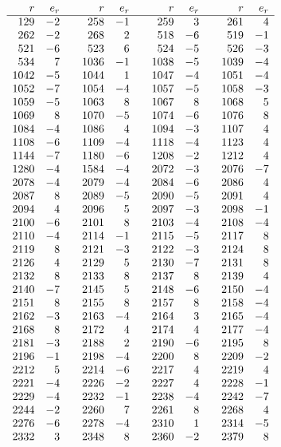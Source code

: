 {\small
\[
\begin{array}{rr@{\qquad}rr@{\qquad}rr@{\qquad}rr}
r&e_r&r&e_r&r&e_r&r&e_r\\ \hline
129&-2&258&-1&259&3&261&4\\
262&-2&268&2&518&-6&519&-1\\
521&-6&523&6&524&-5&526&-3\\
534&7&1036&-1&1038&-5&1039&-4\\
1042&-5&1044&1&1047&-4&1051&-4\\
1052&-7&1054&-4&1057&-5&1058&-3\\
1059&-5&1063&8&1067&8&1068&5\\
1069&8&1070&-5&1074&-6&1076&8\\
1084&-4&1086&4&1094&-3&1107&4\\
1108&-6&1109&-4&1118&-4&1123&4\\
1144&-7&1180&-6&1208&-2&1212&4\\
1280&-4&1584&-4&2072&-3&2076&-7\\
2078&-4&2079&-4&2084&-6&2086&4\\
2087&8&2089&-5&2090&-5&2091&4\\
2094&4&2096&5&2097&-3&2098&-1\\
2100&-6&2101&8&2103&-4&2108&-4\\
2110&-4&2114&-1&2115&-5&2117&8\\
2119&8&2121&-3&2122&-3&2124&8\\
2126&4&2129&5&2130&-7&2131&8\\
2132&8&2133&8&2137&8&2139&4\\
2140&-7&2145&5&2148&-6&2150&-4\\
2151&8&2155&8&2157&8&2158&-4\\
2162&-3&2163&-4&2164&3&2165&-4\\
2168&8&2172&4&2174&4&2177&-4\\
2181&-3&2188&2&2190&-6&2195&8\\
2196&-1&2198&-4&2200&8&2209&-2\\
2212&5&2214&-6&2217&4&2219&4\\
2221&-4&2226&-2&2227&4&2228&-1\\
2229&-4&2232&-1&2238&-4&2242&-7\\
2244&-2&2260&7&2261&8&2268&4\\
2276&-6&2278&-4&2310&1&2314&-5\\
2332&3&2348&8&2360&-2&2379&8\\
\end{array}
\]
}

